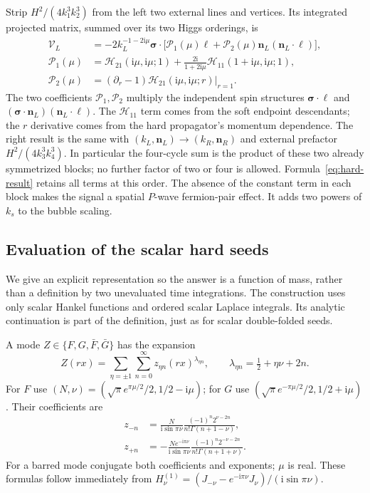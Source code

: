 \documentclass[a4paper,12pt]{article}
\newcommand{\ii}{\mathrm i}
\newcommand{\bs}{\bm\sigma}
\begin{document}
Strip $H^2/(4k_1^3k_2^3)$ from the left two external lines and vertices. Its
integrated projected matrix, summed over its two Higgs orderings, is
\begin{align}
 \mathcal V_L&=-2k_L^{-1-2\ii\mu}\bs\cdot
 \big[\mathcal P_1(\mu)\bm\ell+
 \mathcal P_2(\mu)\bm n_L(\bm n_L\cdot\bm\ell)\big],\\
 \mathcal P_1(\mu)&=\mathcal H_{21}(\ii\mu,\ii\mu;1)
 +\frac{2\ii}{1+2\ii\mu}\mathcal H_{11}(1+\ii\mu,\ii\mu;1),\\
 \mathcal P_2(\mu)&=\left.(\partial_r-1)\mathcal H_{21}(\ii\mu,\ii\mu;r)\right|_{r=1}.
 \label{eq:hard-result}
\end{align}
The two coefficients $\mathcal P_1,\mathcal P_2$ multiply the independent
spin structures $\bs\cdot\bm\ell$ and
$(\bs\cdot\bm n_L)(\bm n_L\cdot\bm\ell)$.
The $\mathcal H_{11}$ term comes from the soft endpoint descendants;
the $r$ derivative comes from the hard propagator's momentum dependence.
The right result is the same with $(k_L,\bm n_L)\to(k_R,\bm n_R)$ and external
prefactor $H^2/(4k_3^3k_4^3)$. In particular the four-cycle sum is the product
of these two already symmetrized blocks; no further factor of two or four is
allowed. Formula~\eqref{eq:hard-result} retains all terms at this order.
The absence of the constant term in each block makes the signal a spatial
$P$-wave fermion-pair effect. It adds two powers of $k_s$ to the bubble scaling.

\subsection{Evaluation of the scalar hard seeds}
\label{sec:seed-eval}
We give an explicit representation so the answer is a function of mass, rather
than a definition by two unevaluated time integrations. The construction uses only
scalar Hankel functions and ordered scalar Laplace integrals. Its analytic
continuation is part of the definition, just as for scalar double-folded seeds.

A mode $Z\in\{F,G,\bar F,\bar G\}$ has the expansion
\begin{equation}
 Z(rx)=\sum_{\eta=\pm1}\sum_{n=0}^\infty z_{\eta n}(rx)^{\lambda_{\eta n}},\qquad
 \lambda_{\eta n}=\tfrac12+\eta\nu+2n.
 \label{eq:mode-series}
\end{equation}
For $F$ use $(N,\nu)=(\sqrt\pi e^{\pi\mu/2}/2,1/2-\ii\mu)$;
for $G$ use $(\sqrt\pi e^{-\pi\mu/2}/2,1/2+\ii\mu)$. Their coefficients are
\begin{align}
 z_{-n}&=\frac{N}{\ii\sin\pi\nu}
 \frac{(-1)^n2^{\nu-2n}}{n!\Gamma(n+1-\nu)},\\
 z_{+n}&=-\frac{Ne^{-\ii\pi\nu}}{\ii\sin\pi\nu}
 \frac{(-1)^n2^{-\nu-2n}}{n!\Gamma(n+1+\nu)}.
 \label{eq:mode-coeff}
\end{align}
For a barred mode conjugate both coefficients and exponents; $\mu$ is real.
These formulas follow immediately from
$H_\nu^{(1)}=(J_{-\nu}-e^{-\ii\pi\nu}J_\nu)/(\ii\sin\pi\nu)$.
\end{document}
